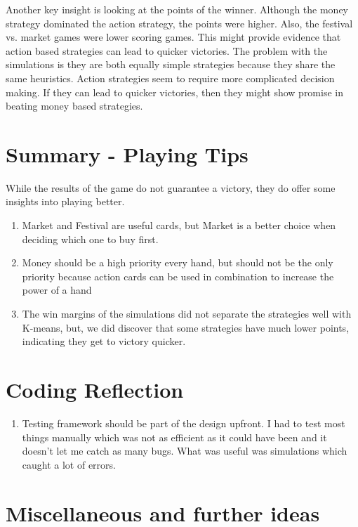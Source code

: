 \documentclass[11pt, oneside]{article}   	%
\begin{document}
Another key insight is looking at the points of the winner. Although the money strategy dominated the action strategy, the points were higher. Also, the festival vs. market games were lower scoring games. This might provide evidence that action based strategies can lead to quicker victories. The problem with the simulations is they are both equally simple strategies because they share the same heuristics. Action strategies seem to require more complicated decision making. If they can lead to quicker victories, then they might show promise in beating money based strategies. 

\section{Summary - Playing Tips}

While the results of the game do not guarantee a victory, they do offer some insights into playing better. 

	\begin{enumerate}
 		 \item Market and Festival are useful cards, but Market is a better choice when deciding which one to buy first. 
		 \item Money should be a high priority every hand, but should not be the only priority because action cards can be used in combination to increase the power of a hand
		 \item The win margins of the simulations did not separate the strategies well with K-means, but, we did discover that some strategies have much lower points, indicating they get to victory quicker. 
	\end{enumerate}

\section{Coding Reflection}

	\begin{enumerate}
 		 \item Testing framework should be part of the design upfront. I had to test most things manually which was not as efficient as it could have been and it doesn't let me catch as many bugs. What was useful was simulations which caught a lot of errors. 
	\end{enumerate}



\section{Miscellaneous and further ideas}
\end{document}
